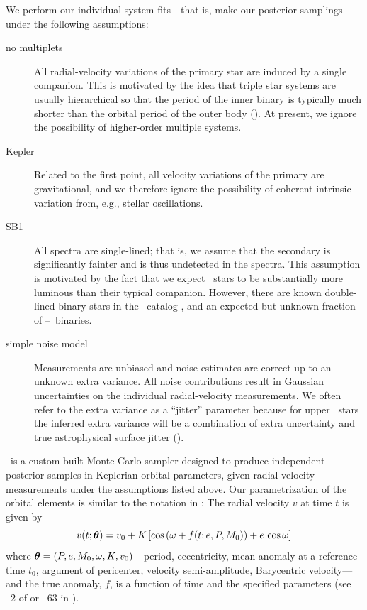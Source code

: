 \documentclass[modern, letterpaper]{aastex62}
\newcommand{\apogee}{\project{\acronym{APOGEE}}}
\newcommand{\thejoker}{\project{The~Joker}}
\newcommand{\RGB}{\acronym{RGB}}
\begin{document}
We perform our individual system fits---that is, make our posterior
samplings---under the following assumptions:
\begin{description}
\item[no multiplets] All radial-velocity variations of the primary star are
  induced by a single companion.
  This is motivated by the idea that triple star systems are usually
  hierarchical so that the period of the inner binary is typically much shorter
  than the orbital period of the outer body ().
  At present, we ignore the possibility of higher-order multiple systems.
\item[Kepler] Related to the first point, all velocity variations of the primary
  are gravitational, and we therefore ignore the possibility of coherent intrinsic variation from, e.g., stellar oscillations.
\item[SB1] All spectra are single-lined; that is, we assume that the secondary
  is significantly fainter and is thus undetected in the spectra.
  This assumption is motivated by the fact that we expect \RGB\ stars to be
  substantially more luminous than their typical companion.
  However, there are known double-lined binary stars in the \apogee\ catalog
  \citealt{El-Badry:2017}, and an expected but unknown fraction of \RGB--\RGB\
  binaries.
\item[simple noise model] Measurements are unbiased and noise estimates are
  correct up to an unknown extra variance.
  All noise contributions result in Gaussian uncertainties on the individual
  radial-velocity measurements.
  We often refer to the extra variance as a ``jitter'' parameter because for
  upper \RGB\ stars the inferred extra variance will be a combination of extra
  uncertainty and true astrophysical surface jitter (\todo{CITATION NEEDED}).
\end{description}

\thejoker\ is a custom-built Monte Carlo sampler designed to produce independent
posterior samples in Keplerian orbital parameters, given radial-velocity
measurements under the assumptions listed above.
Our parametrization of the orbital elements is similar to the notation in
\citet{Murray:2010}:
The radial velocity $v$ at time $t$ is given by
\begin{equation}
  v(t;\bs{\theta}) = v_0 + K\,[\cos\left(\omega + f(t; e, P, M_0)\right) +
    e\,\cos\omega]
\end{equation}
where $\boldsymbol{\theta} = (P,e,M_0,\omega,K,v_0)$---period, eccentricity, mean
anomaly at a reference time $t_0$, argument of pericenter, velocity
semi-amplitude, Barycentric velocity---and the true anomaly, $f$, is a function
of time and the specified parameters (see \sectionname~2 of
\citealt{Price-Whelan:2017} or \eqname~63 in \citealt{Murray:2010}).
\end{document}
